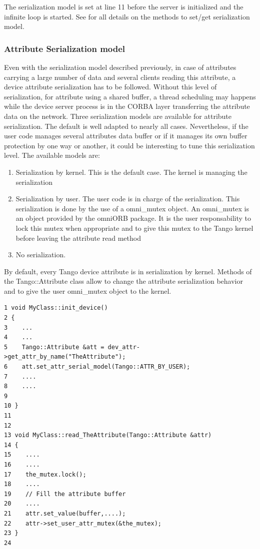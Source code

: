 The serialization model is set at line 11 before the server is initialized
and the infinite loop is started. See \cite{TANGO_ref_man} for all
details on the methods to set/get serialization model.


\subsubsection{Attribute Serialization model}

Even with the serialization model described previously, in case of
attributes carrying a large number of data and several clients reading
this attribute, a device attribute serialization has to be followed.
Without this level of serialization, for attribute using a shared
buffer, a thread scheduling may happens while the device server process
is in the CORBA layer transferring the attribute data on the network.
Three serialization models are available for
attribute serialization. The default is well adapted to nearly all
cases. Nevertheless, if the user code manages several attributes data
buffer or if it manages its own buffer protection by one way or another,
it could be interesting to tune this serialization level. The available
models are:
\begin{enumerate}
\item Serialization by kernel. This is the default case. The kernel is managing
the serialization
\item Serialization by user. The user code is in charge of the serialization.
This serialization is done by the use of a omni\_mutex object. An
omni\_mutex is an object provided by the omniORB package. It is the
user responsability to lock this mutex when appropriate and to give
this mutex to the Tango kernel before leaving the attribute read method
\item No serialization.
\end{enumerate}
By default, every Tango device attribute is in serialization by kernel.
Methods of the Tango::Attribute class allow to change the attribute
serialization behavior and to give the user omni\_mutex object to
the kernel.


\begin{verbatim}
1 void MyClass::init_device()
2 {
3    ...
4    ...
5    Tango::Attribute &att = dev_attr->get_attr_by_name("TheAttribute");
6    att.set_attr_serial_model(Tango::ATTR_BY_USER);
7    ....
8    ....
9 
10 }
11 
12 
13 void MyClass::read_TheAttribute(Tango::Attribute &attr)
14 {
15    ....
16    ....
17    the_mutex.lock();
18    ....
19    // Fill the attribute buffer
20    ....
21    attr.set_value(buffer,....);
22    attr->set_user_attr_mutex(&the_mutex);
23 }
24 
\end{verbatim}


